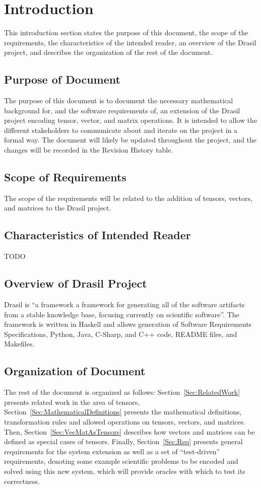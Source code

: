 \documentclass[12pt]{article}
\begin{document}

\section{Introduction}
This introduction section states the purpose of this document, the scope of 
the requirements, the characteristics of the intended reader, an overview of the
Drasil project, and describes the organization of the rest of the document.

\subsection{Purpose of Document}
The purpose of this document is to document the necessary mathematical background for,
and the software requirements of, an extension of the Drasil project encoding tensor,
vector, and matrix operations. It is intended to allow the different stakeholders to
communicate about and iterate on the project in a formal way. The document will likely
be updated throughout the project, and the changes will be recorded in the Revision
History table.

\subsection{Scope of Requirements} 
The scope of the requirements will be related to the addition of tensors, vectors,
and matrices to the Drasil project.

\subsection{Characteristics of Intended Reader}\label{sec_IntendedReader}
TODO

\subsection{Overview of Drasil Project}
Drasil is ``a framework a framework for generating all of the software artifacts from 
a stable knowledge base, focusing currently on scientific software''. The framework
is written in Haskell and allows generation of Software Requirements Specifications,
Python, Java, C-Sharp, and C++ code, README files, and Makefiles.

\subsection{Organization of Document}
The rest of the document is organized as follows: Section~\ref{Sec:RelatedWork} 
presents related work in the area of tensors, Section~\ref{Sec:MathematicalDefinitions}
presents the mathematical definitions, transformation rules and allowed operations
on tensors, vectors, and matrices. Then, Section~\ref{Sec:VecMatAsTensors} describes
how vectors and matrices can be defined as special cases of tensors. Finally, 
Section~\ref{Sec:Req} presents general requirements for the system extension as well as
a set of ``test-driven'' requirements, denoting some example scientific problems
to be encoded and solved using this new system, which will provide oracles with which
to test its correctness.
\end{document}
